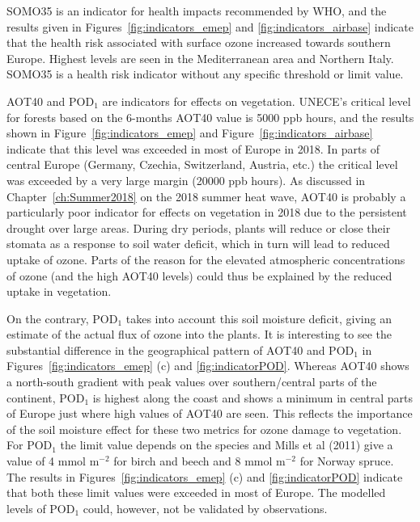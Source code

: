 SOMO35 is an indicator for health impacts recommended by WHO, and the results given in Figures~\ref{fig:indicators_emep} and \ref{fig:indicators_airbase} indicate that the health risk associated with surface ozone increased towards southern Europe. Highest levels are seen in the Mediterranean area and Northern Italy. SOMO35 is a health risk indicator without any specific threshold or limit value.

AOT40 and POD$_1$ are indicators for effects on vegetation. UNECE's critical level for forests based on the 6-months AOT40 value is 5000 ppb hours, and the results shown in Figure~\ref{fig:indicators_emep} and Figure~\ref{fig:indicators_airbase} indicate that this level was exceeded in most of Europe in 2018. In parts of central Europe (Germany, Czechia, Switzerland, Austria, etc.) the critical level was exceeded by a very large margin (20000 ppb hours). As discussed in Chapter~\ref{ch:Summer2018} on the 2018 summer heat wave, AOT40 is probably a particularly poor indicator for effects on vegetation in 2018 due to the persistent drought over large areas. During dry periods, plants will reduce or close their stomata as a response to soil water deficit, which in turn will lead to reduced uptake of ozone. Parts of the reason for the elevated atmospheric concentrations of ozone (and the high AOT40 levels) could thus be explained by the reduced uptake in vegetation. 

On the contrary, POD$_1$ takes into account this soil moisture deficit, giving an estimate of the actual flux of ozone into the plants. It is interesting to see the substantial difference in the geographical pattern of AOT40 and POD$_1$ in Figures~\ref{fig:indicators_emep} (c) and \ref{fig:indicatorPOD}. Whereas AOT40 shows a north-south gradient with peak values over southern/central parts of the continent, POD$_1$ is highest along the coast and shows a minimum in central parts of Europe just where high values of AOT40 are seen. This reflects the importance of the soil moisture effect for these two metrics for ozone damage to vegetation. For POD$_1$ the limit value depends on the species and Mills et al (2011) give a value of 4 mmol m$^{-2}$ for birch and beech and 8 mmol m$^{-2}$ for Norway spruce. The results in Figures~\ref{fig:indicators_emep} (c) and \ref{fig:indicatorPOD} indicate that both these limit values were exceeded in most of Europe. The modelled levels of POD$_1$ could, however, not be validated by observations. 


